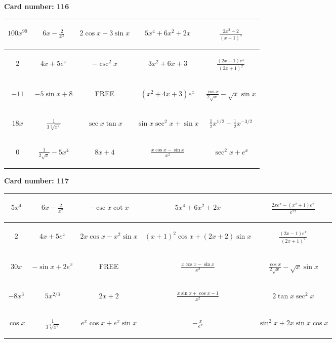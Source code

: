 \documentclass{article}
\newcommand{\entry}[1]{\begin{minipage}[t][2.75cm][t]{4cm} \vspace{1cm} \begin{center}#1\end{center} \end{minipage}}
\newcommand{\freespace}{\entry{FREE}}
\newcommand{\cardnumber}[1]{\noindent \textbf{Card number: #1} \bigskip}
\begin{document}
\pagebreak

\cardnumber{116}
\begin{center}
\begin{tabular}{|*{5}{c|}}
    \hline
    \entry{$100x^{99}$} & \entry{$6x - \frac{2}{x^2}$} & \entry{$2 \cos x - 3 \sin x$} & \entry{$5x^4 + 6x^2 + 2x$} & \entry{$\frac{2x^2 - 2}{(x + 1)^4}$} \\ \hline
    \entry{$2$} & \entry{$4x + 5e^x$} & \entry{$-\csc^2 x$} & \entry{$3x^2 + 6x + 3$} & \entry{$\frac{(2x - 1) e^x}{(2x + 1)^2}$} \\ \hline
    \entry{$-11$} & \entry{$-5 \sin x + 8$} & \freespace & \entry{$(x^2 + 4x + 3) e^x$} & \entry{$\frac{\cos x}{2 \sqrt{x}} - \sqrt{x} \sin x$} \\ \hline
    \entry{$18x$} & \entry{$\frac{1}{3\sqrt[3]{x^2}}$} & \entry{$\sec x \tan x$} & \entry{$\sin x \sec^2 x + \sin x$} & \entry{$\frac{1}{2} x^{1/2} - \frac{1}{2} x^{-3/2}$} \\ \hline
    \entry{$0$} & \entry{$\frac{1}{2\sqrt{x}} - 5x^4$} & \entry{$8x + 4$} & \entry{$\frac{x \cos x - \sin x}{x^2}$} & \entry{$\sec^2 x + e^x$} \\ \hline
\end{tabular}
\end{center}

\pagebreak

\cardnumber{117}
\begin{center}
\begin{tabular}{|*{5}{c|}}
    \hline
    \entry{$5x^4$} & \entry{$6x - \frac{2}{x^2}$} & \entry{$-\csc x \cot x$} & \entry{$5x^4 + 6x^2 + 2x$} & \entry{$\frac{2x e^x - (x^2 + 1) e^x}{e^{2x}}$} \\ \hline
    \entry{$2$} & \entry{$4x + 5e^x$} & \entry{$2x \cos x - x^2 \sin x$} & \entry{$(x + 1)^2 \cos x + (2x + 2) \sin x$} & \entry{$\frac{(2x - 1) e^x}{(2x + 1)^2}$} \\ \hline
    \entry{$30x$} & \entry{$-\sin x + 2e^x$} & \freespace & \entry{$\frac{x \cos x - \sin x}{x^2}$} & \entry{$\frac{\cos x}{2 \sqrt{x}} - \sqrt{x} \sin x$} \\ \hline
    \entry{$-8x^3$} & \entry{$5x^{2/3}$} & \entry{$2x + 2$} & \entry{$\frac{x \sin x + \cos x - 1}{x^2}$} & \entry{$2 \tan x \sec^2 x$} \\ \hline
    \entry{$\cos x$} & \entry{$\frac{1}{3\sqrt[3]{x^2}}$} & \entry{$e^x \cos x + e^x \sin x$} & \entry{$-\frac{x}{e^x}$} & \entry{$\sin^2 x + 2x \sin x \cos x$} \\ \hline
\end{tabular}
\end{center}
\end{document}
